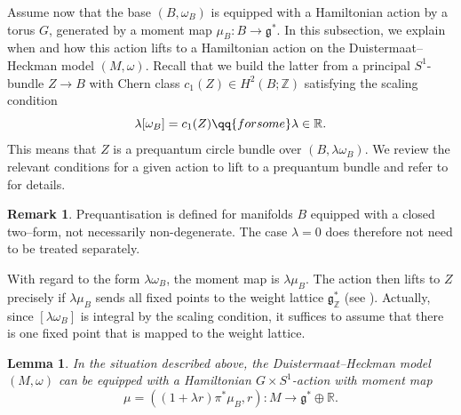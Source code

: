 \documentclass[10pt,oneside,reqno]{amsart}
\newtheorem{lemma}[theorem]{Lemma}
\theoremstyle{definition}
\newtheorem*{remark}{Remark}
\newcommand{\fg}{\mathfrak{g}}
\newcommand{\IR}{\mathbb{R}}
\newcommand{\IZ}{\mathbb{Z}}
\newcommand{\fgz}{\mathfrak{g}_\mathbb{Z}}
\begin{document}
Assume now that the base $(B,\omega_B)$ is equipped with a Hamiltonian action by a torus $G$, generated by a moment map $\mu_B:B\to \fg^*.$ In this subsection, we explain when and how this action lifts to a Hamiltonian action on the Duistermaat--Heckman model $(M,\omega)$. Recall that we build the latter from a principal $S^1$-bundle $Z\to B$ with Chern class $c_1(Z)\in H^2(B;\IZ)$ satisfying the scaling condition
\begin{equation}
    \label{eq:scaling2}
    \lambda [\omega_B] = c_1(Z) \qq{for some} \lambda \in \IR.
\end{equation}
This means that $Z$ is a prequantum circle bundle over $(B,\lambda\omega_B)$. We review the relevant conditions for a given action to lift to a prequantum bundle and refer to \cite[Chapter 6]{guillemin2002moment} for details. 
\begin{remark}
    Prequantisation is defined for manifolds $B$ equipped with a closed two--form, not necessarily non-degenerate. The case $\lambda=0$ does therefore not need to be treated separately.
\end{remark}
With regard to the form $\lambda \omega_B$, the moment map is $\lambda \mu_B$. The action then lifts to $Z$ precisely if $\lambda \mu_B$ sends all fixed points to the weight lattice $\fgz^*$ (see \cite[Example 6.10]{guillemin2002moment}). Actually, since $[\lambda\omega_B]$ is integral by the scaling condition, it suffices to assume that there is one fixed point that is mapped to the weight lattice. 
\begin{lemma} \label{lem:hamiltonianlift}
In the situation described above, the Duistermaat--Heckman model $(M,\omega)$ can be equipped with a Hamiltonian $G\times S^1$-action with moment map
$$\mu=((1+\lambda r)\pi^*\mu_B,r):M \to \fg^*\oplus \IR.$$
\end{lemma}
\end{document}
